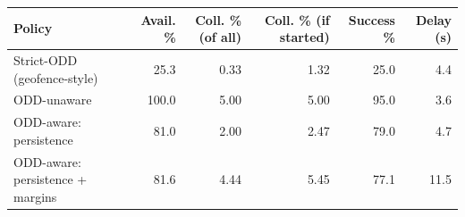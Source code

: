 \begin{tabular}{lrrrrr}
\toprule
Policy & Avail. \% & Coll. \% (of all) & Coll. \% (if started) & Success \% & Delay (s) \\
\midrule
Strict-ODD (geofence-style) & 25.3 & 0.33 & 1.32 & 25.0 & 4.4 \\
ODD-unaware & 100.0 & 5.00 & 5.00 & 95.0 & 3.6 \\
ODD-aware: persistence & 81.0 & 2.00 & 2.47 & 79.0 & 4.7 \\
ODD-aware: persistence + margins & 81.6 & 4.44 & 5.45 & 77.1 & 11.5 \\
\bottomrule
\end{tabular}
